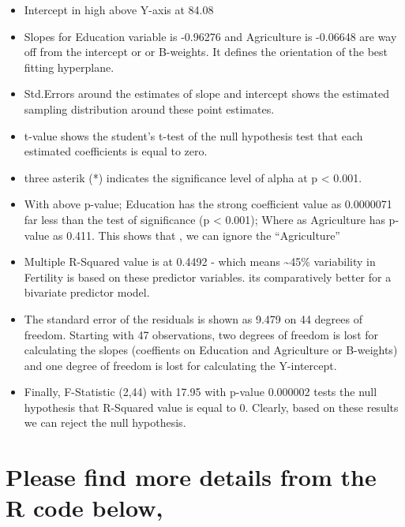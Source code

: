 \documentclass[]{article}
\providecommand{\tightlist}{%
  \setlength{\itemsep}{0pt}\setlength{\parskip}{0pt}}
\begin{document}
\begin{itemize}
\begin{itemize}
    \begin{itemize}
    \tightlist
    \item
      Intercept in high above Y-axis at 84.08
    \item
      Slopes for Education variable is -0.96276 and Agriculture is
      -0.06648 are way off from the intercept or or B-weights. It
      defines the orientation of the best fitting hyperplane.
    \item
      Std.Errors around the estimates of slope and intercept shows the
      estimated sampling distribution around these point estimates.
    \item
      t-value shows the student's t-test of the null hypothesis test
      that each estimated coefficients is equal to zero.
    \item
      three asterik (*) indicates the significance level of alpha at p
      \textless{} 0.001.
    \item
      With above p-value; Education has the strong coefficient value as
      0.0000071 far less than the test of significance (p \textless{}
      0.001); Where as Agriculture has p-value as 0.411. This shows that
      , we can ignore the ``Agriculture''
    \item
      Multiple R-Squared value is at 0.4492 - which means
      \textasciitilde{}45\% variability in Fertility is based on these
      predictor variables. its comparatively better for a bivariate
      predictor model.
    \item
      The standard error of the residuals is shown as 9.479 on 44
      degrees of freedom. Starting with 47 observations, two degrees of
      freedom is lost for calculating the slopes (coeffients on
      Education and Agriculture or B-weights) and one degree of freedom
      is lost for calculating the Y-intercept.
    \item
      Finally, F-Statistic (2,44) with 17.95 with p-value 0.000002 tests
      the null hypothesis that R-Squared value is equal to 0. Clearly,
      based on these results we can reject the null hypothesis.
    \end{itemize}
  \end{itemize}
\end{itemize}

\hypertarget{please-find-more-details-from-the-r-code-below-1}{%
\section{Please find more details from the R code
below,}\label{please-find-more-details-from-the-r-code-below-1}}
\end{document}
